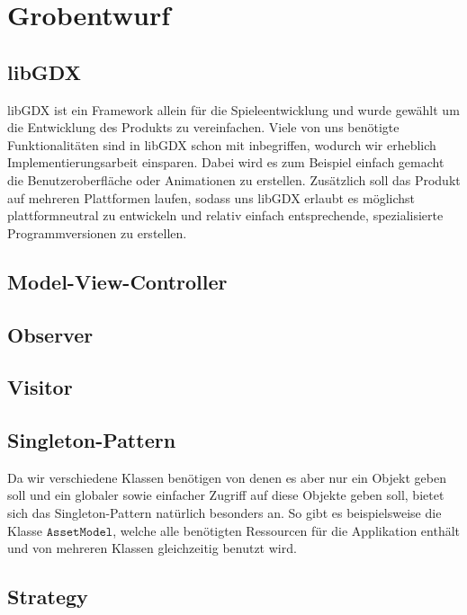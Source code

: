 \section{Grobentwurf}

\subsection{libGDX}
libGDX ist ein Framework allein für die Spieleentwicklung und wurde gewählt um die Entwicklung des Produkts zu vereinfachen.
Viele von uns benötigte Funktionalitäten sind in libGDX schon mit inbegriffen, wodurch wir erheblich Implementierungsarbeit einsparen.
Dabei wird es zum Beispiel einfach gemacht die Benutzeroberfläche oder Animationen zu erstellen.
Zusätzlich soll das Produkt auf mehreren Plattformen laufen, sodass uns libGDX erlaubt es möglichst plattformneutral zu entwickeln 
und relativ einfach entsprechende, spezialisierte Programmversionen zu erstellen.


\subsection{Model-View-Controller}

\subsection{Observer}

\subsection{Visitor}

\subsection{Singleton-Pattern}
Da wir verschiedene Klassen benötigen von denen es aber nur ein Objekt geben soll und ein globaler sowie einfacher Zugriff auf diese Objekte geben soll, bietet sich das Singleton-Pattern natürlich besonders an. So gibt es beispielsweise die Klasse $\texttt{AssetModel}$, welche alle benötigten Ressourcen für die Applikation enthält und von mehreren Klassen gleichzeitig benutzt wird.

\subsection{Strategy}
